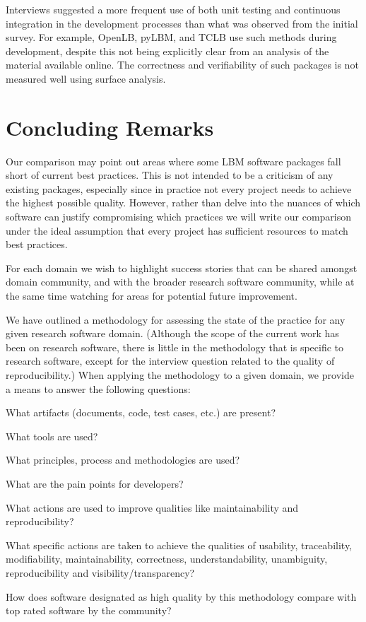 \documentclass[runningheads]{llncs}
\begin{document}
Interviews suggested a more frequent use of both unit testing and continuous
integration in the development processes than what was observed from the initial
survey. For example, OpenLB, pyLBM, and TCLB use such methods during
development, despite this not being explicitly clear from an analysis of the
material available online.  The correctness and verifiability of such packages
is not measured well using surface analysis.

\section{Concluding Remarks} \label{SecConcludingRemarks}

Our comparison may point out areas where some LBM software
packages fall short of current best practices. This is not intended to be a
criticism of any existing packages, especially since in practice not every
project needs to achieve the highest possible quality.  However, rather than
delve into the nuances of which software can justify compromising which
practices we will write our comparison under the ideal assumption that every
project has sufficient resources to match best practices.

For each domain we wish to highlight success stories that can be shared amongst
domain community, and with the broader research software community, while at the
same time watching for areas for potential future improvement.

We have outlined a methodology for assessing the state of the practice for any
given research software domain.  (Although the scope of the current work has been
on research software, there is little in the methodology that is specific to
research software, except for the interview question related to the quality of
reproducibility.)  When applying the methodology to a given domain, we provide a
means to answer the following questions:
\begin{inparaenum}[i)]
\item What artifacts (documents, code, test cases, etc.) are present?
\item What tools are used?
\item What principles, process and methodologies are used?
\item What are the pain points for developers?
\item What actions are used to improve qualities like maintainability and
reproducibility?
\item What specific actions are taken to achieve the qualities of usability,
traceability, modifiability, maintainability, correctness, understandability,
unambiguity, reproducibility and visibility/transparency?
\item How does software designated as high quality by this methodology compare
  with top rated software by the community?
\end{inparaenum} 
\end{document}
